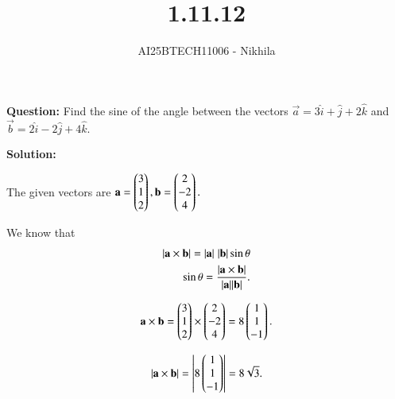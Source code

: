 \documentclass[journal]{IEEEtran}
\begin{document}

\vspace{3cm}

\title{1.11.12}
\author{AI25BTECH11006 - Nikhila}
{\let\newpage\relax\maketitle}


\renewcommand{\thefigure}{\theenumi}
\renewcommand{\thetable}{\theenumi}
\setlength{\intextsep}{10pt} %


\renewcommand{\thetable}{\theenumi}


\textbf{Question:} Find the sine of the angle between the vectors  $\vec{a} = 3\hat{i} + \hat{j} + 2\hat{k}$ and\\
\hspace*{1em} $\vec{b} = 2\hat{i} - 2\hat{j} + 4\hat{k}.$

\vspace{2em}

\textbf{Solution:}


The given vectors are $\vec{a} = \myvec{3 \\ 1 \\ 2}, \vec{b} = \myvec{2 \\ -2 \\ 4}.$

We know that 
\begin{align}
|\vec{a}\times\vec{b}| = |\vec{a}| \hspace{0.3em} |\vec{b}|\sin\theta \\
\sin\theta = \frac{|\vec{a}\times \vec{b}|}{|\vec{a}||\vec{b}|}.
\end{align}

\begin{align}
\vec{a} \times \vec{b} = \myvec{3 \\ 1 \\ 2} \times \myvec{2 \\ -2 \\ 4}
 =  8\myvec{1 \\ 1 \\ -1}.
\end{align}

\begin{align}    
|\vec{a}\times\vec{b}| =  \left| 8\myvec{1 \\ 1 \\ -1} \right|  =  8\sqrt{3}.
\end{align}
\end{document}
